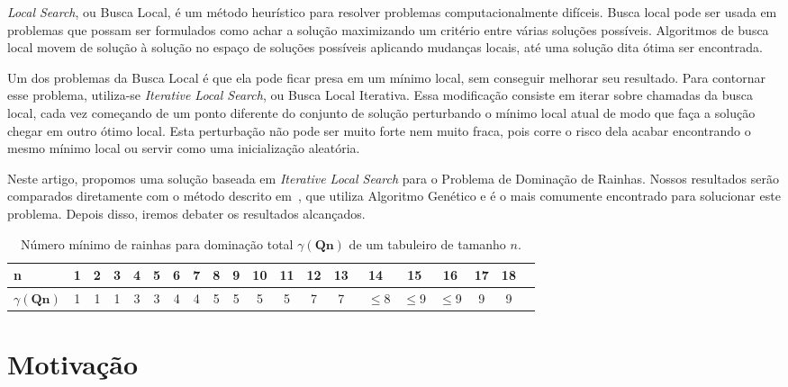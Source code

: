 \documentclass[sigconf]{acmart}
\begin{document}
\textit{Local Search}, ou Busca Local, é um método heurístico para resolver problemas computacionalmente difíceis. Busca local pode ser usada em problemas que possam ser formulados como achar a solução maximizando um critério entre várias soluções possíveis. Algoritmos de busca local movem de solução à solução no espaço de soluções possíveis aplicando mudanças locais, até uma solução dita ótima ser encontrada.~\cite{hoos2004stochastic}

Um dos problemas da Busca Local é que ela pode ficar presa em um mínimo local, sem conseguir melhorar seu resultado. Para contornar esse problema, utiliza-se \textit{Iterative Local Search}, ou Busca Local Iterativa. Essa modificação consiste em iterar sobre chamadas da busca local, cada vez começando de um ponto diferente do conjunto de solução perturbando o mínimo local atual de modo que faça a solução chegar em outro ótimo local. Esta perturbação não pode ser muito forte nem muito fraca, pois corre o risco dela acabar encontrando o mesmo mínimo local ou servir como uma inicialização aleatória.~\cite{lourencco2010iterated}

  Neste artigo, propomos uma solução baseada em \textit{Iterative Local Search} para o Problema de Dominação de Rainhas. Nossos resultados serão comparados diretamente com o método descrito em~\cite{alharbi2017genetic}, que utiliza Algoritmo Genético e é o mais comumente encontrado para solucionar este problema. Depois disso, iremos debater os resultados alcançados.

\begin{table}[ht]
  \caption{Número mínimo de rainhas para dominação total $\gamma(\textbf{Qn})$ de um tabuleiro de tamanho $\textit{n}$.}
  \begin{tabular}{l*{18}{c}r}
    n              & 1 & 2 & 3 & 4 & 5  & 6 & 7 & 8 & 9 & 10 & 11 & 12 & 13 & 14 & 15 & 16 & 17 & 18 \\
    \hline
    $\gamma(\textbf{Qn})$ & 1 & 1 & 1 & 3 & 3 & 4 & 4 & 5 & 5 & 5 & 5 & 7 & 7 & ~$\leq$8 & $\leq$9 & $\leq$9  & 9 & 9 \\
  \end{tabular}
  \label{tabela1}
\end{table}



\section{Motivação}
\end{document}
